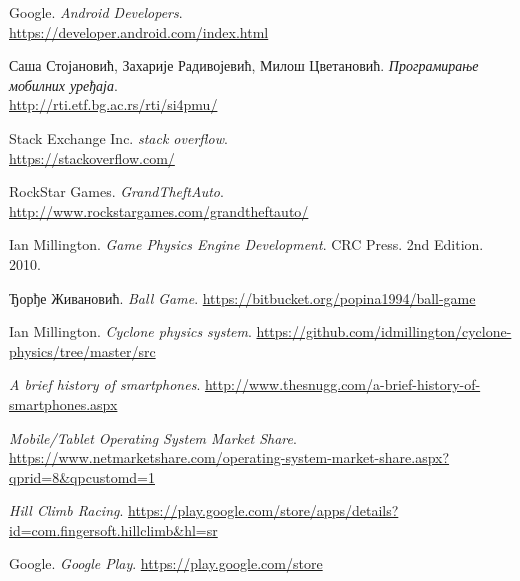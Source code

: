 \begin{thebibliography}{refs}
		Google.
		\emph{Android Developers}.\\
		\url{https://developer.android.com/index.html}

		Саша Стојановић, Захарије Радивојевић, Милош Цветановић.
		\emph{Програмирање мобилних уређаја}.\\
		\url{http://rti.etf.bg.ac.rs/rti/si4pmu/}

		Stack Exchange Inc.
		\emph{stack overflow}.\\
		\url{https://stackoverflow.com/}

		RockStar Games.
		\emph{GrandTheftAuto}.
		\url{http://www.rockstargames.com/grandtheftauto/}

		Ian Millington.
		\emph{Game Physics Engine Development}.
		CRC Press.
		2nd Edition. 2010.

		Ђорђе Живановић.
		\emph{Ball Game}.
		\url{https://bitbucket.org/popina1994/ball-game}


		Ian Millington.
		\emph{Cyclone physics system}.
		\url{https://github.com/idmillington/cyclone-physics/tree/master/src}

		\emph{A brief history of smartphones}.
		\url{http://www.thesnugg.com/a-brief-history-of-smartphones.aspx}

		\emph{Mobile/Tablet Operating System Market Share}.
		\url{https://www.netmarketshare.com/operating-system-market-share.aspx?qprid=8&qpcustomd=1}

		\emph{Hill Climb Racing}.
		\url{https://play.google.com/store/apps/details?id=com.fingersoft.hillclimb&hl=sr}

		Google.
		\emph{Google Play}.
		\url{https://play.google.com/store}






\end{thebibliography}
